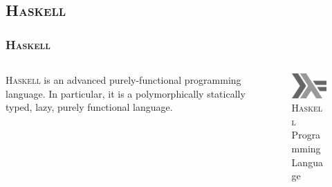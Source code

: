 \documentclass[hideothersubsections]{beamer}
\newcommand{\progLang}[1]{\textsc{#1}}
\begin{document}
\subsection{\progLang{Haskell}}
\begin{frame}
\frametitle{\progLang{Haskell}}
  \begin{columns}[T]
    \begin{column}{.7\textwidth}
     \begin{block}{}
\progLang{Haskell} is an advanced purely-functional programming language. In particular, it is a polymorphically statically typed, lazy, purely functional language.
\note[item]{}
    \end{block}
    \end{column}
    \begin{column}{.3\textwidth}
    \begin{block}{}
\begin{figure}
    \includegraphics[width=\textwidth]{haskelllogo.jpg} 
    \caption{\progLang{Haskell} Programming Language}
 \end{figure}   
    \end{block}
    \end{column}
  \end{columns}
\end{frame}
\end{document}
